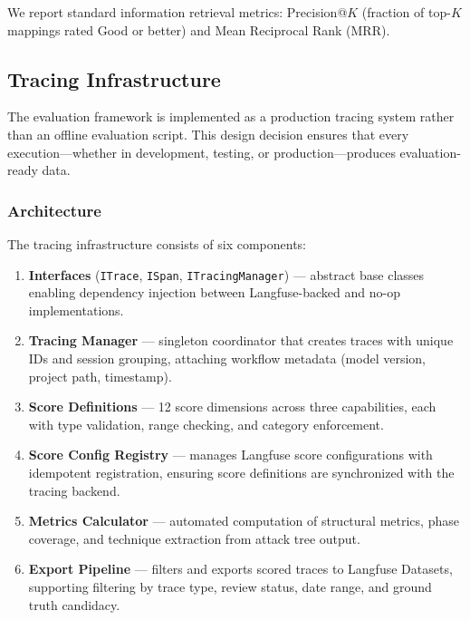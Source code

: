 We report standard information retrieval metrics: Precision@$K$ (fraction of top-$K$ mappings rated Good or better) and Mean Reciprocal Rank (MRR).

\subsection{Tracing Infrastructure}
\label{sec:tracing}

The evaluation framework is implemented as a production tracing system rather than an offline evaluation script. This design decision ensures that every \threatforest{} execution---whether in development, testing, or production---produces evaluation-ready data.

\subsubsection{Architecture}

The tracing infrastructure consists of six components:

\begin{enumerate}
    \item \textbf{Interfaces} (\texttt{ITrace}, \texttt{ISpan}, \texttt{ITracingManager}) --- abstract base classes enabling dependency injection between Langfuse-backed and no-op implementations.
    \item \textbf{Tracing Manager} --- singleton coordinator that creates traces with unique IDs and session grouping, attaching workflow metadata (model version, project path, timestamp).
    \item \textbf{Score Definitions} --- 12 score dimensions across three capabilities, each with type validation, range checking, and category enforcement.
    \item \textbf{Score Config Registry} --- manages Langfuse score configurations with idempotent registration, ensuring score definitions are synchronized with the tracing backend.
    \item \textbf{Metrics Calculator} --- automated computation of structural metrics, phase coverage, and technique extraction from attack tree output.
    \item \textbf{Export Pipeline} --- filters and exports scored traces to Langfuse Datasets, supporting filtering by trace type, review status, date range, and ground truth candidacy.
\end{enumerate}

